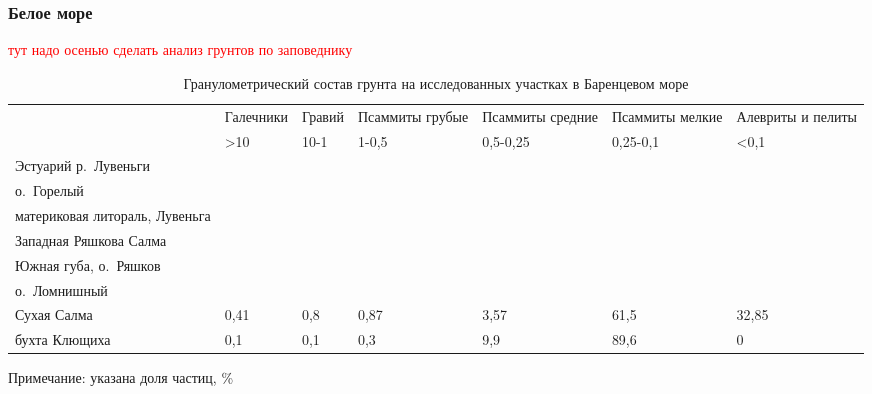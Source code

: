             \subsubsection{Белое море}
\textcolor{red}{тут надо осенью сделать анализ грунтов по заповеднику}

    \begin{table}[ht]
    \caption{Гранулометрический состав грунта на исследованных участках в Баренцевом море}
    \label{tab:grunt_granulometriya_White}
    \begin{tabularx}{\textwidth}{|p{}|*{6}{X|}} \hline
                            & Галечники      & Гравий & Псаммиты грубые & Псаммиты средние & Псаммиты мелкие & Алевриты и пелиты \\
                             & \textgreater10 & 10-1   & 1-0,5           & 0,5-0,25         & 0,25-0,1        & \textless0,1      \\ \hline
Эстуарий р.~Лувеньги           &                &        &                 &                  &                 &                   \\ \hline
о.~Горелый                     &                &        &                 &                  &                 &                   \\ \hline
материковая литораль, Лувеньга &                &        &                 &                  &                 &                   \\ \hline
Западная Ряшкова Салма         &                &        &                 &                  &                 &                   \\ \hline
Южная губа, о.~Ряшков          &                &        &                 &                  &                 &                   \\ \hline
о.~Ломнишный                   &                &        &                 &                  &                 &                   \\ \hline
Сухая Салма                    & 0,41           & 0,8    & 0,87            & 3,57             & 61,5            & 32,85             \\ \hline
бухта Клющиха                  & 0,1            & 0,1    & 0,3             & 9,9              & 89,6            & 0                 \\ \hline
   \end{tabularx}

    {\footnotesize Примечание: указана доля частиц, \%}
    \end{table}

